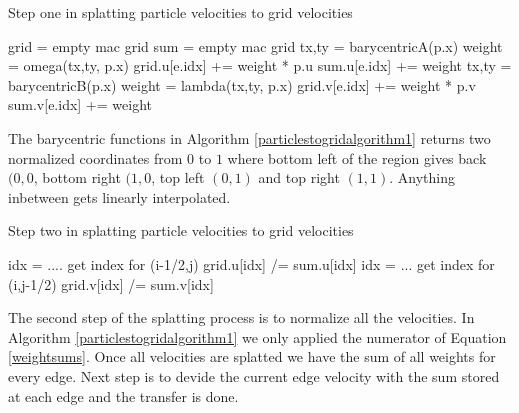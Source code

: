 \begin{algorithm}
\caption{Step one in splatting particle velocities to grid velocities}
\begin{algorithmic}
\STATE grid = empty mac grid
\STATE sum = empty mac grid
\STATE tx,ty = barycentricA(p.x)
\STATE weight = omega(tx,ty, p.x)
\STATE grid.u[e.idx] += weight * p.u
\STATE sum.u[e.idx] += weight
\ENDFOR
\STATE tx,ty = barycentricB(p.x)
\STATE weight = lambda(tx,ty, p.x)
\STATE grid.v[e.idx] += weight * p.v
\STATE sum.v[e.idx] += weight
\ENDFOR
\ENDFOR
\end{algorithmic}
\label{particlestogridalgorithm1}
\end{algorithm}

The barycentric functions in Algorithm \ref{particlestogridalgorithm1} returns two normalized coordinates from $0$ to $1$ where bottom left of the region gives back $(0,0$, bottom right $(1,0$, top left $(0,1)$ and top right $(1,1)$. Anything inbetween gets linearly interpolated.

\begin{algorithm}
\caption{Step two in splatting particle velocities to grid velocities}
\begin{algorithmic}
\STATE idx = .... get index for (i-1/2,j)
\STATE grid.u[idx] /= sum.u[idx]
\STATE idx = ... get index for (i,j-1/2)
\STATE grid.v[idx] /= sum.v[idx]
\ENDFOR
\ENDFOR
\end{algorithmic}
\label{particlestogridalgorithm2}
\end{algorithm}

The second step of the splatting process is to normalize all the velocities. In Algorithm \ref{particlestogridalgorithm1} we only applied the numerator of Equation \ref{weightsums}. Once all velocities are splatted we have the sum of all weights for every edge. Next step is  to devide the current edge velocity with the sum stored at each edge and the transfer is done.
